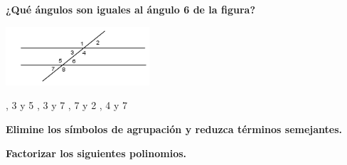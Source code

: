 \documentclass[11pt, addpoints, answers]{exam}
\begin{document}
\begin{questions}
		\question[1] \textbf{¿Qué ángulos son iguales al ángulo 6 de la figura?}
		\begin{center}
			\includegraphics[width=0.4\textwidth]{image_243168.png}
		\end{center}
		\begin{choices}
			, 3 y 5
			, 3 y 7
			, 7 y 2
			, 4 y 7
		\end{choices}
		
		\question[1] \textbf{Elimine los símbolos de agrupación y reduzca términos semejantes.}  
		
		\question[1] \textbf{Factorizar los siguientes polinomios.}  
		

\end{questions}
\end{document}
